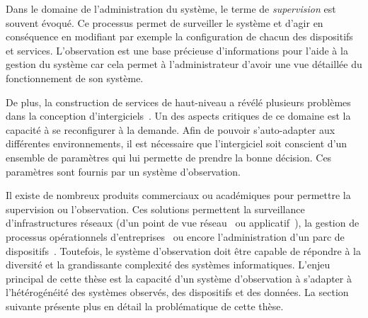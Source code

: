 Dans le domaine de l'administration du système, le terme de \textit{supervision} est souvent évoqué. Ce processus permet de surveiller le système et d'agir en conséquence en modifiant par exemple la configuration de chacun des dispositifs et services. L'observation est une base précieuse d'informations pour l'aide à la gestion du système car cela permet à l'administrateur d'avoir une vue détaillée du fonctionnement de son système.

De plus, la construction de services de haut-niveau a révélé plusieurs problèmes dans la conception d'intergiciels~\cite{Geihs:challenges}. Un des aspects critiques de ce domaine est la capacité à se reconfigurer à la demande. Afin de pouvoir s'auto-adapter aux différentes environnements, il est nécessaire que l'intergiciel soit conscient d'un ensemble de paramètres qui lui permette de prendre la bonne décision. Ces paramètres sont fournis par un système d'observation.

Il existe de nombreux produits commerciaux ou académiques pour permettre la supervision ou l'observation. Ces solutions permettent la surveillance d'infrastructures réseaux (d'un point de vue réseau~\cite{url:zabbix} ou applicatif~\cite{url:manageengine}), la gestion de processus opérationnels d'entreprises~\cite{url:systar} ou encore l'administration d'un parc de dispositifs~\cite{IETF:SNMP}. Toutefois, le système d'observation doit être capable de répondre à la diversité et la grandissante complexité des systèmes informatiques. L'enjeu principal de cette thèse est la capacité d'un système d'observation à s'adapter à l'hétérogénéité des systèmes observés, des dispositifs et des données. La section suivante présente plus en détail la problématique de cette thèse.